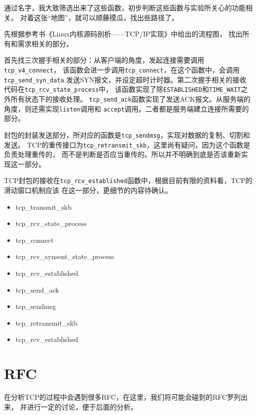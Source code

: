 通过名字，我大致筛选出来了这些函数，初步判断这些函数与实验所关心的功能相关。
对着这张``地图''，就可以顺藤摸瓜，找出些路径了。

先根据参考书《Linux内核源码剖析------TCP/IP实现》中给出的流程图，
找出所有和需求相关的部分。

首先找三次握手相关的部分：从客户端的角度，发起连接需要调用\texttt{tcp_v4_connect}，
该函数会进一步调用\texttt{tcp_connect}，在这个函数中，会调用\texttt{tcp_send_syn_data}
发送SYN报文，并设定超时计时器。第二次握手相关的接收代码在\texttt{tcp_rcv_state_process}中，
该函数实现了除\texttt{ESTABLISHED}和\texttt{TIME_WAIT}之外所有状态下的接收处理。
\texttt{tcp_send_ack}函数实现了发送ACK报文。从服务端的角度，则还需实现\texttt{listen}调用和
\texttt{accept}调用。二者都是服务端建立连接所需要的部分。

封包的封装发送部分，所对应的函数是\texttt{tcp_sendmsg}，实现对数据的复制、切割和发送。
TCP的重传接口为\texttt{tcp_retransmit_skb}，这里尚有疑问，因为这个函数是负责处理重传的，
而不是判断是否应当重传的。所以并不明确到底是否该重新实现这一部分。

TCP封包的接收在\texttt{tcp_rcv_established}函数中，根据目前有限的资料看，TCP的滑动窗口机制应该
在这一部分，更细节的内容待确认。

\begin{itemize}
\item
  tcp\_transmit\_skb
\item
  tcp\_rcv\_state\_process
\item
  tcp\_connect
\item
  tcp\_rcv\_synsent\_state\_process
\item
  tcp\_rcv\_established
\item
  tcp\_send\_ack
\item
  tcp\_sendmsg
\item
  tcp\_retransmit\_skb
\item
  tcp\_rcv\_established
\end{itemize}

\section{RFC}
\label{sec:rfc}

在分析TCP的过程中会遇到很多RFC，在这里，我们将可能会碰到的RFC罗列出来，
并进行一定的讨论，便于后面的分析。

